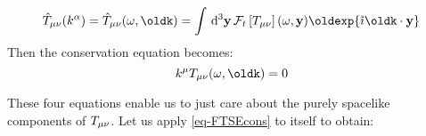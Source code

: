 \documentclass[
  letterpaper,
  DIV=11,
  numbers=noendperiod,
  oneside]{scrreprt}
\begin{document}
\[
\mathtip{\hat{\texttip{T}{Stress-Energy tensor, or energy-momentum tensor}}}{\text{Fourier transform of $\texttip{T}{Stress-Energy tensor, or energy-momentum tensor}$ in variable $\mathbf{x}$: }{\hat{\texttip{T}{Stress-Energy tensor, or energy-momentum tensor}}\left(\oldk\right)
 = \int \,\mathrm{d}^{}\mathbf{x}\, \texttip{T}{Stress-Energy tensor, or energy-momentum tensor}(\mathbf{x}) \oldexp{\mathtip{{\mathring{\imath}}}{\text{Complex unit: } {\mathring{\imath}}^2 = -1}\oldk \cdot \mathbf{x}}}}_{\mu\nu}(\texttip{k^{\alpha}}{contravariant mathbftor component}) =\mathtip{\hat{\texttip{T}{Stress-Energy tensor, or energy-momentum tensor}}}{\text{Fourier transform of $\texttip{T}{Stress-Energy tensor, or energy-momentum tensor}$ in variable $\mathbf{x}$: }{\hat{\texttip{T}{Stress-Energy tensor, or energy-momentum tensor}}\left(\oldk\right)
 = \int \,\mathrm{d}^{}\mathbf{x}\, \texttip{T}{Stress-Energy tensor, or energy-momentum tensor}(\mathbf{x}) \oldexp{\mathtip{{\mathring{\imath}}}{\text{Complex unit: } {\mathring{\imath}}^2 = -1}\oldk \cdot \mathbf{x}}}}_{\mu\nu}(\omega,\oldk) = \int \,\mathrm{d}^{3}\mathbf{y}\, \mathtip{\mathcal{F}_{t}\left[\texttip{\texttip{T}{Stress-Energy tensor, or energy-momentum tensor}_{{\mu\nu}}}{covariant Stress-Energy tensor component}\right]}{\text{Fourier transform of $\texttip{\texttip{T}{Stress-Energy tensor, or energy-momentum tensor}_{{\mu\nu}}}{covariant Stress-Energy tensor component}$ in variable $t$: }{\mathcal{F}_{t}\left[\texttip{\texttip{T}{Stress-Energy tensor, or energy-momentum tensor}_{{\mu\nu}}}{covariant Stress-Energy tensor component}\right] = \int \,\mathrm{d}^{}t\, \texttip{\texttip{T}{Stress-Energy tensor, or energy-momentum tensor}_{{\mu\nu}}}{covariant Stress-Energy tensor component}(t) \oldexp{\mathtip{{\mathring{\imath}}}{\text{Complex unit: } {\mathring{\imath}}^2 = -1}\omega \cdot t}   }}(\omega,\mathbf{y}) \oldexp{\mathtip{{\mathring{\imath}}}{\text{Complex unit: } {\mathring{\imath}}^2 = -1}\oldk\cdot\mathbf{y}}
\] Then the conservation equation becomes: \[
\texttip{k^{\mu}}{contravariant mathbftor component}\texttip{\texttip{T}{Stress-Energy tensor, or energy-momentum tensor}_{{\mu\nu}}}{covariant Stress-Energy tensor component}(\omega,\oldk) = 0
\]

These four equations enable us to just care about the purely spacelike
components of
\(\texttip{\texttip{T}{Stress-Energy tensor, or energy-momentum tensor}_{{\mu\nu}}}{covariant Stress-Energy tensor component}\).
Let us apply \ref{eq-FTSEcons} to itself to obtain:
\end{document}
